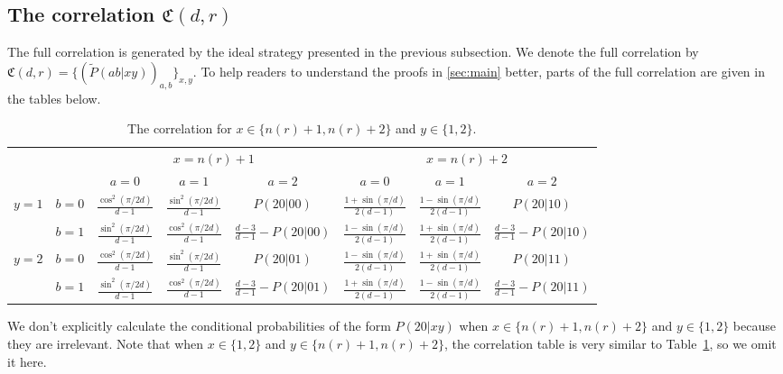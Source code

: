 \documentclass[11pt,letterpaper]{article}
\newcommand{\1}{\mathbb{1}}
\newcommand{\nr}{n(r)}
\newcommand{\fC}{\mathfrak{C}}
\newcommand{\pr}[2]{P(#1|#2)}
\newcommand{\tpr}[2]{\tilde{P}(#1|#2)}
\theoremstyle{definition}
\begin{document}
\subsection{The correlation $\fC(d,r)$}
\label{sec:cor}
The full correlation is generated by the ideal strategy presented in the previous subsection.
We denote the full correlation by $\fC(d,r) = \{( \tpr{ab}{xy} )_{a,b}\}_{x,y}$.
To help readers to understand the proofs in \cref{sec:main} better, 
parts of the full correlation are given in the tables below.


\begin{table}[H]
\begin{center}
\begin{tabular}{|c|c||c|c|c|c|c|c|}
\hline
\multicolumn{2}{|c|}{} &
\multicolumn{3}{|c|}{$x=\nr+1$}&
\multicolumn{3}{|c|}{$x=\nr+2$} \\
\cline{3-8}
\multicolumn{2}{|c|}{} &
$a = 0$ & $a=1$ & $a=2$ &
$a = 0$ & $a=1$ & $a=2$\\
\hline
\hline
\multirow{2}{*}{$y = 1$} & $b=0$ & $\frac{\cos^2(\pi/2d)}{d-1}$ & $\frac{\sin^2(\pi/2d)}{d-1}$ & \small $\pr{20}{00}$ 
& $\frac{1+\sin(\pi/d)}{2(d-1)}$ & $\frac{1-\sin(\pi/d)}{2(d-1)}$ & \small  $\pr{20}{10}$ \\
\cline{2-8}
&$b=1$ & $\frac{\sin^2(\pi/2d)}{d-1}$ & $\frac{\cos^2(\pi/2d)}{d-1}$ & $\frac{d-3}{d-1}-\pr{20}{00}$ 
&  $\frac{1-\sin(\pi/d)}{2(d-1)}$ & $\frac{1+\sin(\pi/d)}{2(d-1)}$ & \small $\frac{d-3}{d-1} - \pr{20}{10}$  \\
\hline
\multirow{2}{*}{$y = 2$} & $b=0$ & $\frac{\cos^2(\pi/2d)}{d-1}$ & $\frac{\sin^2(\pi/2d)}{d-1}$ & \small $\pr{20}{01}$ & 
$ \frac{1-\sin(\pi/d)}{2(d-1)}$ & $ \frac{1+\sin(\pi/d)}{2(d-1)}$ & \small $\pr{2 0}{11}$  \\
\cline{2-8}
&$b=1$ & $\frac{\sin^2(\pi/2d)}{d-1}$ & $\frac{\cos^2(\pi/2d)}{d-1}$ & \small $\frac{d-3}{d-1}-\pr{20}{01}$ &  
$ \frac{1+\sin(\pi/d)}{2(d-1)}$ & $ \frac{1-\sin(\pi/d)}{2(d-1)}$ & \small $\frac{d-3}{d-1}- \pr{20}{11}$ \\
\hline
\end{tabular}
\end{center}
\caption{The correlation for $x \in \{\nr+1, \nr+2\}$ and $y \in \{1,2\}$.}
\label{tb:chsh}
\end{table}
We don't explicitly calculate the conditional probabilities of the form $\pr{20}{xy}$ when $x \in \{\nr+1, \nr+2\}$ and $y \in \{1, 2\}$ 
because they are irrelevant.
Note that when $x \in \{1,2\}$ and $y \in \{\nr+1, \nr+2\}$, the correlation table is 
very similar to Table~\ref{tb:chsh}, so we omit it here.
\end{document}
